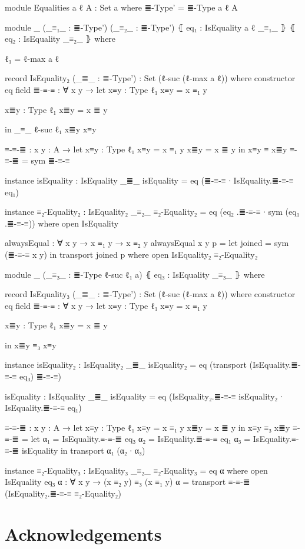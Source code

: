 \documentclass{article}
\begin{document}
\begin{code}
module Equalities {a ℓ} {A : Set a} where
  ≣-Type' = ≣-Type {a} {ℓ} {A}

  module _
    (_≡₁_ : ≣-Type')
    (_≡₂_ : ≣-Type')
    ⦃ eq₁ : IsEquality {a} {ℓ} _≡₁_ ⦄
    ⦃ eq₂ : IsEquality _≡₂_ ⦄
    where

    ℓ₁ = ℓ-max a ℓ

    record IsEquality₂ (_≣_ : ≣-Type') : Set (ℓ-suc (ℓ-max a ℓ)) where
      constructor eq
      field
        ≣-≡-≡ : ∀ {x y} → let
          x≡y : Type ℓ₁
          x≡y = x ≡₁ y

          x≣y : Type ℓ₁
          x≣y = x ≣ y

          in _≡_ {ℓ-suc ℓ₁} x≣y x≡y

      ≡-≡-≣ : {x y : A} → let
        x≡y : Type ℓ₁
        x≡y = x ≡₁ y
        x≣y = x ≣ y
        in x≡y ≡ x≣y
      ≡-≡-≣ = sym ≣-≡-≡

      instance
        isEquality : IsEquality _≣_
        isEquality = eq (≣-≡-≡ ∙ IsEquality.≣-≡-≡ eq₁)

    instance
      ≡₂-Equality₂ : IsEquality₂ _≡₂_
      ≡₂-Equality₂ = eq (eq₂ .≣-≡-≡ ∙ sym (eq₁ .≣-≡-≡))
        where open IsEquality

    alwaysEqual : ∀ {x y} →  x ≡₁ y → x ≡₂ y
    alwaysEqual {x} {y} p =
      let joined = sym (≣-≡-≡ {x} {y})
      in transport joined p
      where open IsEquality₂ ≡₂-Equality₂

    module _
      (_≡₃_ : ≣-Type {ℓ-suc ℓ₁} {a})
      ⦃ eq₃ : IsEquality _≡₃_ ⦄
      where

      record IsEquality₃ (_≣_ : ≣-Type') : Set (ℓ-suc (ℓ-max a ℓ)) where
        constructor eq
        field
          ≣-≡-≡ : ∀ {x y} → let
            x≡y : Type ℓ₁
            x≡y = x ≡₁ y

            x≣y : Type ℓ₁
            x≣y = x ≣ y

            in x≣y ≡₃ x≡y

        instance
          isEquality₂ : IsEquality₂ _≣_
          isEquality₂ = eq (transport (IsEquality.≣-≡-≡ eq₃) ≣-≡-≡)

          isEquality : IsEquality _≣_
          isEquality = eq (IsEquality₂.≣-≡-≡ isEquality₂ ∙ IsEquality.≣-≡-≡ eq₁)

        ≡-≡-≣ : {x y : A} → let
          x≡y : Type ℓ₁
          x≡y = x ≡₁ y
          x≣y = x ≣ y
          in x≡y ≡₃ x≣y
        ≡-≡-≣ = let
          α₁ = IsEquality.≡-≡-≣ eq₃
          α₂ = IsEquality.≣-≡-≡ eq₁
          α₃ = IsEquality.≡-≡-≣ isEquality
          in transport α₁ (α₂ ∙ α₃)

      instance
        ≡₂-Equality₃ : IsEquality₃ _≡₂_
        ≡₂-Equality₃ = eq α
          where
            open IsEquality eq₃
            α : ∀ {x y} → (x ≡₂ y) ≡₃ (x ≡₁ y)
            α = transport ≡-≡-≣ (IsEquality₂.≣-≡-≡ ≡₂-Equality₂)

\end{code}

\section*{Acknowledgements}



\end{document}
